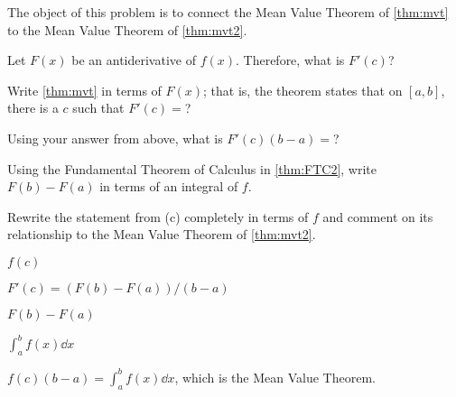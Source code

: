 {The object of this problem is to connect the Mean Value Theorem of \autoref{thm:mvt} to the Mean Value Theorem of \autoref{thm:mvt2}.
\begin{enumext}
\item		Let $F(x)$ be an antiderivative of $f(x)$. Therefore, what is $F'(c)$?
\item		Write \autoref{thm:mvt} in terms of $F(x)$; that is, the theorem states that on $[a,b]$, there is a $c$ such that $F'(c) = $?
\item		Using your answer from above, what is $F'(c)(b-a)=$?
\item		Using the Fundamental Theorem of Calculus in \autoref{thm:FTC2}, write $F(b) -F(a)$ in terms of an integral of $f$.
\item		Rewrite the statement from (c) completely in terms of $f$ and comment on its relationship to the Mean Value Theorem of \autoref{thm:mvt2}.
\end{enumext}
}
{\begin{enumext}
\item		$f(c)$
\item		$F'(c) = (F(b)-F(a))/(b-a)$
\item		$F(b) - F(a)$
\item		$\int_a^b f(x) \dd x$
\item		$f(c)(b-a) = \int_a^b f(x)\dd x$, which is the Mean Value Theorem.
\end{enumext}
}

